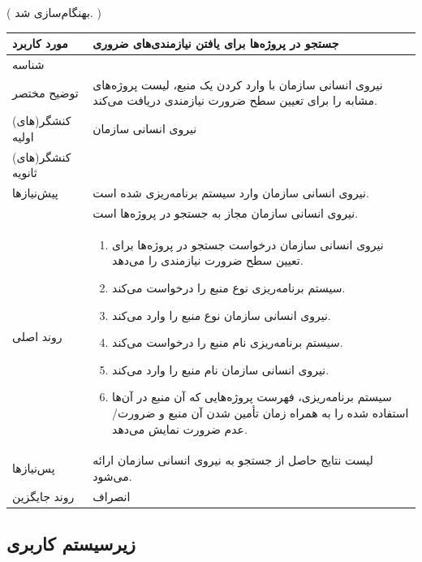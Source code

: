 \newpage
({\color{red} بهنگام‌سازی شد. })
\begin{table}[H]
	\centering
	\begin{tabular}{|p{3cm}|p{10cm}|}
		\hline
		مورد کاربرد & جستجو در پروژه‌ها برای یافتن نیازمندی‌های ضروری  \\
		\hline
		شناسه & 
		\stepcounter{usecase_ID}
		\arabic{usecase_ID} \\
		\hline
		توضیح مختصر & نیروی انسانی سازمان با وارد کردن یک منبع، لیست پروژه‌های مشابه را برای تعیین سطح ضرورت نیازمندی دریافت می‌کند. \\
		\hline
		کنشگر(های) اولیه & نیروی انسانی سازمان \\
		\hline
		کنشگر(های) ثانویه &  \\
		\hline
		پیش‌نیازها & نیروی انسانی سازمان وارد سیستم برنامه‌ریزی شده است. \\
		& نیروی انسانی سازمان مجاز به جستجو در پروژه‌ها است. \\
		\hline
		
		روند اصلی &
		\begin{enumerate}[topsep=0cm,leftmargin=0.5cm]
			\item نیروی انسانی سازمان درخواست جستجو در پروژه‌ها برای تعیین سطح ضرورت نیازمندی را می‌دهد.
			\item سیستم برنامه‌ریزی نوع منبع را درخواست می‌کند. 
			\item نیروی انسانی سازمان نوع منبع را وارد می‌کند. 
			\item سیستم برنامه‌ریزی نام منبع را درخواست می‌کند. 
			\item نیروی انسانی سازمان نام منبع را وارد می‌کند. 
			\item سیستم برنامه‌ریزی، فهرست پروژه‌هایی که آن منبع در آن‌ها استفاده شده را به همراه زمان تأمین شدن آن منبع و ضرورت/عدم ضرورت نمایش می‌دهد.
		\end{enumerate} \\
		
		\hline
		
		پس‌نیازها & لیست نتایج حاصل از جستجو به نیروی انسانی سازمان ارائه می‌شود. \\
		\hline
		روند جایگزین & انصراف \\
		\hline
	\end{tabular}
\end{table}



\newpage
\subsection{زیرسیستم کاربری}

